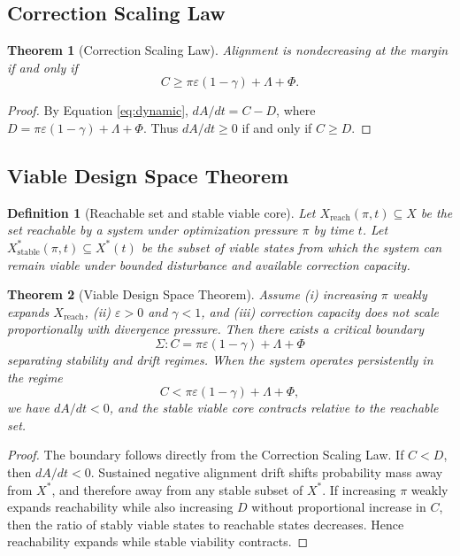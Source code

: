 \documentclass[11pt]{article}
\newtheorem{definition}{Definition}[section]
\newtheorem{theorem}{Theorem}[section]
\newcommand{\Xstar}{X^{\ast}}
\newcommand{\eps}{\varepsilon}
\begin{document}
\subsection{Correction Scaling Law}

\begin{theorem}[Correction Scaling Law]
Alignment is nondecreasing at the margin if and only if
\[
C\ge \pi\eps(1-\gamma)+\Lambda+\Phi.
\]
\end{theorem}

\begin{proof}
By Equation \eqref{eq:dynamic}, \(dA/dt=C-D\), where \(D=\pi\eps(1-\gamma)+\Lambda+\Phi\). Thus \(dA/dt\ge0\) if and only if \(C\ge D\).
\end{proof}

\subsection{Viable Design Space Theorem}

\begin{definition}[Reachable set and stable viable core]
Let \(X_{\mathrm{reach}}(\pi,t)\subseteq X\) be the set reachable by a system under optimization pressure \(\pi\) by time \(t\). Let \(\Xstar_{\mathrm{stable}}(\pi,t)\subseteq\Xstar(t)\) be the subset of viable states from which the system can remain viable under bounded disturbance and available correction capacity.
\end{definition}

\begin{theorem}[Viable Design Space Theorem]
Assume (i) increasing \(\pi\) weakly expands \(X_{\mathrm{reach}}\), (ii) \(\eps>0\) and \(\gamma<1\), and (iii) correction capacity does not scale proportionally with divergence pressure. Then there exists a critical boundary
\[
\Sigma: C=\pi\eps(1-\gamma)+\Lambda+\Phi
\]
separating stability and drift regimes. When the system operates persistently in the regime
\[
C<\pi\eps(1-\gamma)+\Lambda+\Phi,
\]
we have \(dA/dt<0\), and the stable viable core contracts relative to the reachable set.
\end{theorem}

\begin{proof}
The boundary follows directly from the Correction Scaling Law. If \(C<D\), then \(dA/dt<0\). Sustained negative alignment drift shifts probability mass away from \(\Xstar\), and therefore away from any stable subset of \(\Xstar\). If increasing \(\pi\) weakly expands reachability while also increasing \(D\) without proportional increase in \(C\), then the ratio of stably viable states to reachable states decreases. Hence reachability expands while stable viability contracts.
\end{proof}
\end{document}

